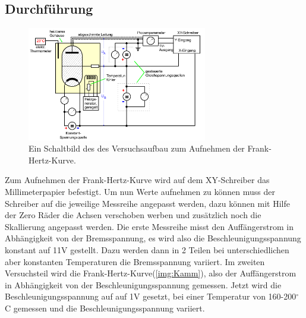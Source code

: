     \subsection{Durchführung}

        \begin{figure}[ht]
            \centering
            \includegraphics[width=0.7\textwidth]{latex/images/Schaltbild.PNG}
            \caption{Ein Schaltbild des des Versuchsaufbau zum Aufnehmen der Frank-Hertz-Kurve.}
            \label{img:Term}
        \end{figure}

        \noindent Zum Aufnehmen der Frank-Hertz-Kurve wird auf dem XY-Schreiber das Millimeterpapier befestigt. Um nun Werte aufnehmen zu können
        muss der Schreiber auf die jeweilige Messreihe angepasst werden, dazu können mit Hilfe der Zero Räder die Achsen verschoben werben und 
        zusätzlich noch die Skallierung angepasst werden. Die erste Messreihe misst den Auffängerstrom in Abhängigkeit von der Bremsspannung, es 
        wird also die Beschleunigungsspannung konstant auf 11V gestellt. Dazu werden dann in 2 Teilen bei unterschiedlichen aber konstanten 
        Temperaturen die Bremsspannung variiert.
        Im zweiten Versuchsteil wird die Frank-Hertz-Kurve(\ref{img:Kamm}), also der Auffängerstrom in Abhängigkeit von der Beschleunigungsspannung gemessen. 
        Jetzt wird die Beschleunigungsspannung auf auf 1V gesetzt, bei einer Temperatur von 160-200$^\circ$C gemessen und die Beschleunigungsspannung variiert.





        
        